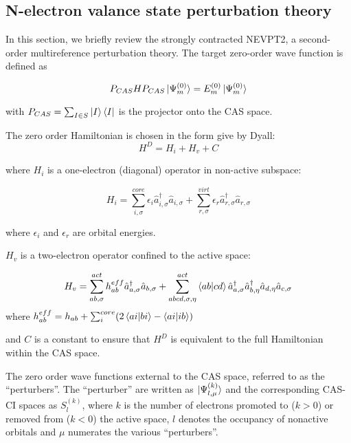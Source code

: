 \subsection{N-electron valance state perturbation theory} 

In this section, we briefly review the strongly contracted NEVPT2\cite{angeli_n-electron_2001, angeli_n-electron_2002}, a second-order multireference perturbation theory. The target zero-order wave function is defined as 

\begin{equation}
P_{CAS}HP_{CAS} \ket{\Psi^{(0)}_m} = E^{(0)}_m \ket{\Psi^{(0)}_m}
\end{equation}

with $P_{CAS} = \sum_{I\in S}\ket{I}\bra{I}$ is the projector onto the CAS space. 

The zero order Hamiltonian is chosen in the form give by Dyall\cite{dyall_choice_1995}:
\begin{equation}
  H^D = H_i + H_v + C
\end{equation}

where $H_i$ is a one-electron (diagonal) operator in non-active subspace:

\begin{equation}
  H_i = \sum_{i,\sigma}^{core} \epsilon_i \hat{a}^\dagger_{i,\sigma}\hat{a}_{i,\sigma} + \sum_{r,\sigma}^{virt} \epsilon_r \hat{a}^\dagger_{r,\sigma}\hat{a}_{r,\sigma}
\end{equation}

where $\epsilon_i $ and $\epsilon_r$ are orbital energies.

$H_v$ is a two-electron operator confined to the active space:

\begin{equation}
  H_v = \sum_{ab,\sigma}^{act} h^{eff}_{ab} \hat{a}^\dagger_{a,\sigma} \hat{a}_{b,\sigma} + \sum_{abcd,\sigma,\eta}^{act} \braket{ab|cd} \hat{a}^\dagger_{a,\sigma}\hat{a}^\dagger_{b,\eta}\hat{a}_{d,\eta}\hat{a}_{c,\sigma}
\end{equation}
where $h_{ab}^{eff} = h_{ab} + \sum_{i}^{core} (2\braket{ai|bi}-\braket{ai|ib})$

and $C$ is a constant to ensure that $H^D$ is equivalent to the full Hamiltonian within the CAS space.

The zero order wave functions external to the CAS space, referred to as the ``perturbers''. The ``perturber'' are written  as $\ket{\Psi^{(k)}_{l,\mu}}$ and the corresponding CAS-CI spaces as $S_l^{(k)}$, where $k$ is the number of electrons promoted to ($k>0$) or removed from ($k<0$) the active space, $l$ denotes the occupancy of nonactive orbitals and $\mu$ numerates the various ``perturbers''. 


